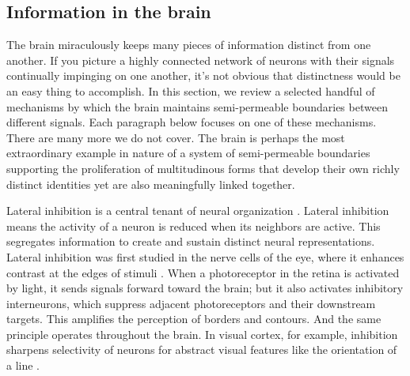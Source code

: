 \documentclass[12pt]{article}
\begin{document}



\subsection{Information in the brain}



The brain miraculously keeps many pieces of information distinct from one another. If you picture a highly connected network of neurons with their signals continually impinging on one another, it's not obvious that distinctness would be an easy thing to accomplish. In this section, we review a selected handful of mechanisms by which the brain maintains semi-permeable boundaries between different signals. Each paragraph below focuses on one of these mechanisms. There are many more we do not cover. The brain is perhaps the most extraordinary example in nature of a system of semi-permeable boundaries supporting the proliferation of multitudinous forms that develop their own richly distinct identities yet are also meaningfully linked together.

Lateral inhibition is a central tenant of neural organization \citep{isaacson2011inhibition, hubel1962receptive, douglas2004neuronal}. Lateral inhibition means the activity of a neuron is reduced when its neighbors are active. This segregates information to create and sustain distinct neural representations. Lateral inhibition was first studied in the nerve cells of the eye, where it enhances contrast at the edges of stimuli \citep{hartline1956inhibition}. When a photoreceptor in the retina is activated by light, it sends signals forward toward the brain; but it also activates inhibitory interneurons, which suppress adjacent photoreceptors and their downstream targets. This amplifies the perception of borders and contours. And the same principle operates throughout the brain. In visual cortex, for example, inhibition sharpens selectivity of neurons for abstract visual features like the orientation of a line \citep{sillito1975contribution}. 
\end{document}
